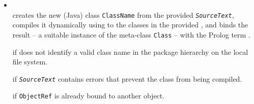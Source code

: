 \begin{itemize}
\item {}\\
    \noindent{}
    creates the new (Java) class \texttt{ClassName} from the provided \texttt{\textit{SourceText}}, compiles it dynamically using to the classes in the provided , and binds the result -- a suitable instance of the meta-class \texttt{Class} -- with the Prolog term .


     if  does not identify a valid class name in the package hierarchy on the local file system.

     if \texttt{\textit{SourceText}} contains errors that prevent the class from being compiled.

     if \texttt{ObjectRef} is already bound to another object.
\end{itemize}

